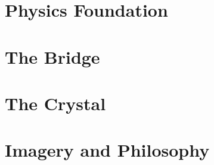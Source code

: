 \documentclass[12pt,a4paper]{book}
\begin{document}
% 

% 

% 

% 

\part{Physics Foundation}

% 

% 

\part{The Bridge}

% 

% 

% 

\part{The Crystal}

% 

% 

% 

% 

% 

\part{Imagery and Philosophy}
\end{document}
